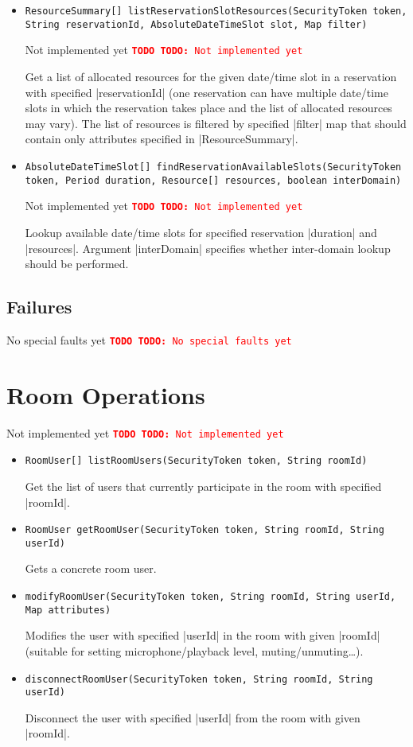 \documentclass[a4paper]{report}
\newenvironment{Api}{\begin{itemize}}{\end{itemize}}
\newcommand{\ApiCode}[1]{\lstinline[style=styleApi]|#1|}
\newcommand{\ApiItem}[1]{\item #1 %

}
\newcommand{\ApiCmd}[1]{\ApiItem{\ApiCode{#1}}}
\newenvironment{ApiFailures}{\begin{compactitem}}{\end{compactitem}}
\newcommand{\ApiFailure}[1]{\ApiItem{\ApiCode{faultCode = #1}}}
\newcommand{\TODO}[1]{%
\def\empty{}%
\def\prvniparametr{#1}%
\ifx\prvniparametr\empty%
\begingroup\tt\textcolor{red}{\noindent\textbf{TODO}}\endgroup
\else%
\begingroup\tt\textcolor{red}{\noindent\textbf{TODO:}\ #1}\endgroup
\fi%
}
\begin{document}
\begin{Api}
\ApiCmd{ResourceSummary[] listReservationSlotResources(SecurityToken token, String reservationId, AbsoluteDateTimeSlot slot, Map filter)}
\TODO{Not implemented yet}
Get a list of allocated resources for the given date/time slot in a reservation with specified |reservationId| (one reservation can have multiple date/time slots in which the reservation takes place and the list of allocated resources may vary). The list of resources is filtered by specified |filter| map that should contain only attributes specified in |ResourceSummary|.

\ApiCmd{AbsoluteDateTimeSlot[] findReservationAvailableSlots(SecurityToken token, Period duration, Resource[] resources, boolean interDomain)}
\TODO{Not implemented yet}
Lookup available date/time slots for specified reservation |duration| and |resources|. Argument |interDomain| specifies whether inter-domain lookup should be performed.

\end{Api}

\subsection{Failures}

\TODO{No special faults yet}


\section{Room Operations}

\TODO{Not implemented yet}

\begin{Api}

\ApiCmd{RoomUser[] listRoomUsers(SecurityToken token, String roomId)}
Get the list of users that currently participate in the room with specified |roomId|.

\ApiCmd{RoomUser getRoomUser(SecurityToken token, String roomId, String userId)}
Gets a concrete room user.

\ApiCmd{modifyRoomUser(SecurityToken token, String roomId, String userId, Map attributes)}
Modifies the user with specified |userId| in the room with given |roomId| (suitable for setting microphone/playback level, muting/unmuting\ldots).

\ApiCmd{disconnectRoomUser(SecurityToken token, String roomId, String userId)}
Disconnect the user with specified |userId| from the room with given |roomId|.

\end{Api}
\end{document}
